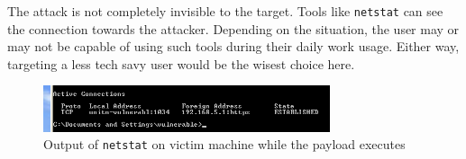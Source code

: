The attack is not completely invisible to the target. Tools like \texttt{netstat} can see the connection towards the attacker. Depending on the situation, the user may or may not be capable of using such tools during their daily work usage. Either way, targeting a less tech savy user would be the wisest choice here.

\begin{figure}[htbp]
    \centering
    \includegraphics[width=0.75\textwidth]{../drawable/exercise_3_screenshots/victim_connection.PNG}
    \caption{Output of \texttt{netstat} on victim machine while the payload executes}
    \label{fig:ex3:victim-connections}
\end{figure}

\clearpage